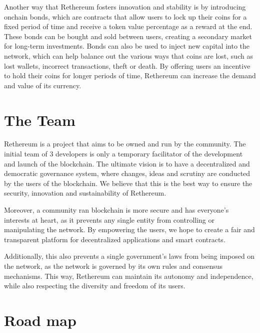\documentclass[a4paper,onecolumn, superscriptaddress,10pt,accepted=2020-05-01,issue=1, volume=2, shorttitle=papers]{compositionalityarticle}
\begin{document}
\vspace{0.3cm}

Another way that Rethereum fosters innovation and stability is by introducing onchain bonds, which are contracts that allow users to lock up their coins for a fixed period of time and receive a token value percentage as a reward at the end. These bonds can be bought and sold between users, creating a secondary market for long-term investments. Bonds can also be used to inject new capital into the network, which can help balance out the various ways that coins are lost, such as lost wallets, incorrect transactions, theft or death. By offering users an incentive to hold their coins for longer periods of time, Rethereum can increase the demand and value of its currency.

\section{The Team}

Rethereum is a project that aims to be owned and run by the community. The initial team of 3 developers is only a temporary facilitator of the development and launch of the blockchain. The ultimate vision is to have a decentralized and democratic governance system, where changes, ideas and scrutiny are conducted by the users of the blockchain. We believe that this is the best way to ensure the security, innovation and sustainability of Rethereum.

\vspace{0.3cm}

Moreover, a community ran blockchain is more secure and has everyone's interests at heart, as it prevents any single entity from controlling or manipulating the network. By empowering the users, we hope to create a fair and transparent platform for decentralized applications and smart contracts.

\vspace{0.3cm}

Additionally, this also prevents a single government's laws from being imposed on the network, as the network is governed by its own rules and consensus mechanisms. This way, Rethereum can maintain its autonomy and independence, while also respecting the diversity and freedom of its users.

\section{Road map}
\end{document}
